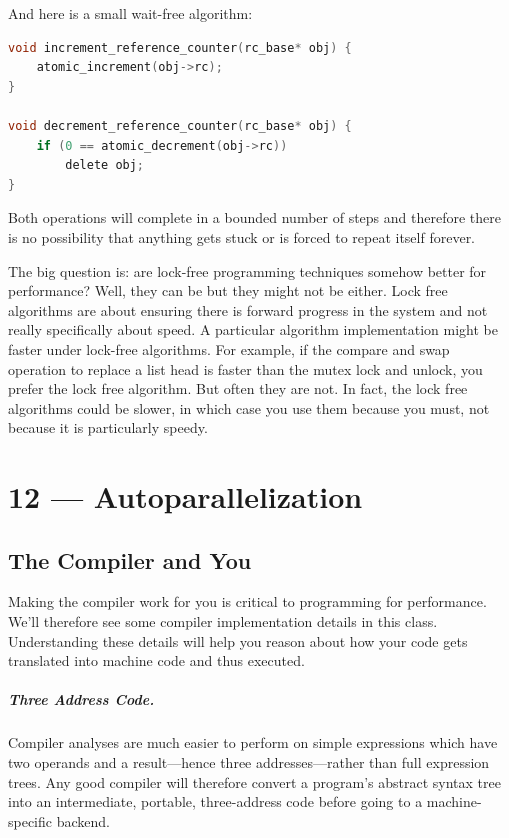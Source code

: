 \documentclass[a4paper]{report}
\begin{document}
And here is a small wait-free algorithm:

\begin{lstlisting}[language=C]
void increment_reference_counter(rc_base* obj) {
    atomic_increment(obj->rc);
}

void decrement_reference_counter(rc_base* obj) {
    if (0 == atomic_decrement(obj->rc))
        delete obj;
} 
\end{lstlisting}

Both operations will complete in a bounded number of steps and therefore there is no possibility that anything gets stuck or is forced to repeat itself forever. 

The big question is: are lock-free programming techniques somehow better for performance? Well, they can be but they might not be either. Lock free algorithms are about ensuring there is forward progress in the system and not really specifically about speed. A particular algorithm implementation might be faster under lock-free algorithms. For example, if the compare and swap operation to replace a list head is faster than the mutex lock and unlock, you prefer the lock free algorithm. But often they are not. In fact, the lock free algorithms could be slower, in which case you use them because you must, not because it is particularly speedy.









\chapter*{12 --- Autoparallelization}


\section*{The Compiler and You}
Making the compiler work for you is critical to programming for
performance. We'll therefore see some compiler implementation details
in this class. Understanding these details will help you reason about
how your code gets translated into machine code and thus executed.

\paragraph{Three Address Code.} Compiler analyses are much easier to
perform on simple expressions which have two operands and a
result---hence three addresses---rather than full expression trees.
Any good compiler will therefore convert a program's abstract syntax
tree into an intermediate, portable, three-address code before going
to a machine-specific backend.
\end{document}
